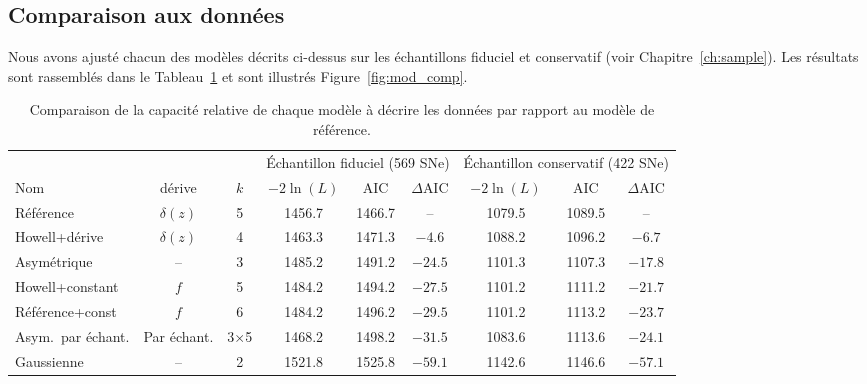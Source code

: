 \documentclass[../main/main.tex]{subfiles}
\begin{document}
\subsection{Comparaison aux données}\label{ssec:xcomp}
Nous avons ajusté chacun des modèles décrits ci-dessus sur les échantillons
fiduciel et conservatif (voir Chapitre~\ref{ch:sample}). Les résultats sont
rassemblés dans le Tableau~\ref{tab:comp} et sont illustrés
Figure~\ref{fig:mod_comp}.

\begin{table}[ht]
    \centerfloat
    \begin{threeparttable}
        \caption[Comparaison de la capacité relative de chaque modèle à décrire
        les données par rapport au modèle de référence]{Comparaison de la
            capacité relative de chaque modèle à décrire les données par rapport
        au modèle de référence.}\label{tab:comp}
        \begin{tabular}{lcccccccc}
            \toprule
            & & & \multicolumn{3}{c}{Échantillon fiduciel (569 SNe)}
                & \multicolumn{3}{c}{Échantillon conservatif (422 SNe)} \\
            \cmidrule(lr){4-6} \cmidrule(lr){6-9}
            Nom & dérive & $k$ &
            $-2\ln(L)$ & AIC & $\Delta$AIC & $-2\ln(L)$ & AIC & $\Delta$AIC\\
            \midrule
            Référence & $\delta(z)$ & 5
            & 1456.7 & 1466.7 & -- 
            & 1079.5 & 1089.5 & -- \\
            Howell+dérive & $\delta(z)$ & 4
            & 1463.3 & 1471.3 & $-4.6$
            & 1088.2 & 1096.2 & $-6.7$ 
            \\
            Asymétrique & -- & 3
            & 1485.2 & 1491.2 & $-24.5$
            & 1101.3 & 1107.3 & $-17.8$ 
            \\
            Howell+constant & $f$ & 5
            & 1484.2 & 1494.2 & $-27.5$
            & 1101.2 & 1111.2 & $-21.7$ 
            \\
            Référence+const & $f$ & 6
            & 1484.2 & 1496.2 & $-29.5$
            & 1101.2 & 1113.2 & $-23.7$ 
            \\
            Asym.\ par échant. & Par échant. & 3$\times$5
            & 1468.2 & 1498.2  & $-31.5$
            & 1083.6 & 1113.6  & $-24.1$ 
            \\
            Gaussienne & -- & 2
            & 1521.8 & 1525.8 & $-59.1$
            & 1142.6 & 1146.6 & $-57.1$ 
            \\

\end{tabular}
\end{threeparttable}
\end{table}
\end{document}
